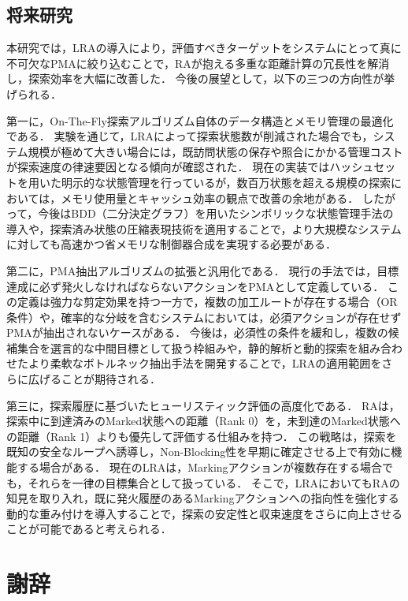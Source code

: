 \documentclass[a4paper,11pt,oneside,openany,report,dvipdfmx]{jsbook}
\begin{document}
\section{将来研究}

本研究では，LRAの導入により，評価すべきターゲットをシステムにとって真に不可欠なPMAに絞り込むことで，RAが抱える多重な距離計算の冗長性を解消し，探索効率を大幅に改善した．
今後の展望として，以下の三つの方向性が挙げられる．

第一に，On-The-Fly探索アルゴリズム自体のデータ構造とメモリ管理の最適化である．
実験を通じて，LRAによって探索状態数が削減された場合でも，システム規模が極めて大きい場合には，既訪問状態の保存や照合にかかる管理コストが探索速度の律速要因となる傾向が確認された．
現在の実装ではハッシュセットを用いた明示的な状態管理を行っているが，数百万状態を超える規模の探索においては，メモリ使用量とキャッシュ効率の観点で改善の余地がある．
したがって，今後はBDD（二分決定グラフ）を用いたシンボリックな状態管理手法の導入や，探索済み状態の圧縮表現技術を適用することで，より大規模なシステムに対しても高速かつ省メモリな制御器合成を実現する必要がある．

第二に，PMA抽出アルゴリズムの拡張と汎用化である．
現行の手法では，目標達成に必ず発火しなければならないアクションをPMAとして定義している．
この定義は強力な剪定効果を持つ一方で，複数の加工ルートが存在する場合（OR条件）や，確率的な分岐を含むシステムにおいては，必須アクションが存在せずPMAが抽出されないケースがある．
今後は，必須性の条件を緩和し，複数の候補集合を選言的な中間目標として扱う枠組みや，静的解析と動的探索を組み合わせたより柔軟なボトルネック抽出手法を開発することで，LRAの適用範囲をさらに広げることが期待される．

第三に，探索履歴に基づいたヒューリスティック評価の高度化である．
RAは，探索中に到達済みのMarked状態への距離（Rank 0）を，未到達のMarked状態への距離（Rank 1）よりも優先して評価する仕組みを持つ．
この戦略は，探索を既知の安全なループへ誘導し，Non-Blocking性を早期に確定させる上で有効に機能する場合がある．
現在のLRAは，Markingアクションが複数存在する場合でも，それらを一律の目標集合として扱っている．
そこで，LRAにおいてもRAの知見を取り入れ，既に発火履歴のあるMarkingアクションへの指向性を強化する動的な重み付けを導入することで，探索の安定性と収束速度をさらに向上させることが可能であると考えられる．

\appendix

\backmatter

\chapter{謝辞}
\end{document}
